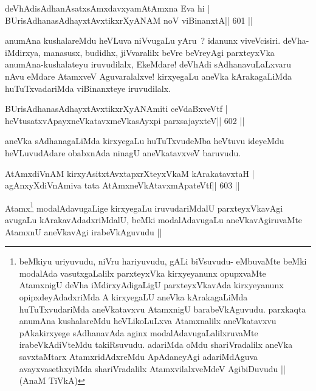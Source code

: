 \begin{shl}
deVhAdisAdhanAsatxsAmxdavxyamAtAmxna Eva hi |
BUrisAdhanasAdhayxtAvxtikxrXyANAM noV viBinanxtA\hfill || 601 ||
\end{shl}

\begin{artha}
anumAna kushalareMdu heVLuva niVvugaLu yAru~? idanunx viveVcisiri. deVha-iMdirxya, manasusx, budidhx, jiVvaralilx beVre beVreyAgi parxteyxVka anumAna-kushalateyu iruvudilalx, EkeMdare! deVhAdi sAdhanavuLaLxvaru nAvu eMdare AtamxveV Aguvaralalxve! kirxyegaLu aneVka kArakagaLiMda huTuTxvadariMda viBinanxteye iruvudilalx.
\end{artha}

\begin{shl}
BUrisAdhanasAdhayxtAvxtikxrXyANAmiti ceVdaBxveVtf |
heVtusatxvApayxneVkatavxmeVkasAyxpi parxsajayxteV\hfill || 602 ||
\end{shl}

\begin{artha}
aneVka sAdhanagaLiMda kirxyegaLu huTuTxvudeMba heVtuvu ideyeMdu heVLuvudAdare obabxnAda ninagU aneVkatavxveV baruvudu.
\end{artha}



\begin{shl}
AtAmxdiVnAM kirxyAsitxtAvxtapxrXteyxVkaM kArakatavxtaH |
agAnxyXdiVnAmiva tata AtAmxneVkAtavxmApateVtf\hfill || 603 ||
\end{shl}

\begin{artha}
Atamx\footnote[1]{beMkiyu uriyuvudu, niVru hariyuvudu, gALi biVsuvudu-
  eMbuvaMte beMki modalAda vasutxgaLalilx parxteyxVka kirxyeyanunx
  opupxvaMte AtamxnigU deVha iMdirxyAdigaLigU parxteyxVkavAda
  kirxyeyanunx opipxdeyAdadxriMda A kirxyegaLU aneVka kArakagaLiMda
  huTuTxvudariMda aneVkatavxvu AtamxnigU barabeVkAguvudu. parxkaqta
  anumAna kushalareMdu heVLikoLuLxva Atamxnalilx aneVkatavxvu
  pAkakirxyege sAdhanavAda aginx modalAdavugaLalilxruvaMte
  irabeVkAdiVteMdu takiRsuvudu. adariMda oMdu shariVradalilx aneVka
  savxtaMtarx AtamxridAdxreMdu ApAdaneyAgi adariMdAguva
  avayxvasethxyiMda shariVradalilx AtamxvilalxveMdeV AgibiDuvudu || 
  (AnaM TiVkA)} modalAdavugaLige kirxyegaLu iruvudariMdalU
parxteyxVkavAgi avugaLu kArakavAdadxriMdalU, beMki modalAdavugaLu
aneVkavAgiruvaMte AtamxnU aneVkavAgi irabeVkAguvudu ||
\end{artha}




